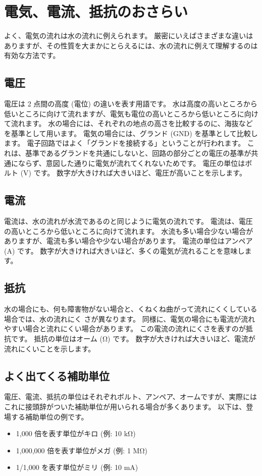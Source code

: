 \documentclass[11pt,a4paper]{jarticle}
\begin{document}
\section{電気、電流、抵抗のおさらい}
よく、電気の流れは水の流れに例えられます。
厳密にいえばさまざまな違いはありますが、その性質を大まかにとらえるには、水の流れに例えて理解するのは有効な方法です。

\subsection*{電圧}
電圧は 2 点間の高度 (電位) の違いを表す用語です。
水は高度の高いところから低いところに向けて流れますが、電気も電位の高いところから低いところに向けて流れます。
水の場合には、それぞれの地点の高さを比較するのに、海抜などを基準として用います。
電気の場合には、グランド (GND) を基準として比較します。
電子回路ではよく「グランドを接続する」ということが行われます。
これは、基準であるグランドを共通にしないと、回路の部分ごとの電圧の基準が共通にならず、意図した通りに電気が流れてくれないためです。
電圧の単位はボルト (V) です。
数字が大きければ大きいほど、電圧が高いことを示します。

\subsection*{電流}
電流は、水の流れが水流であるのと同じように電気の流れです。
電流は、電圧の高いところから低いところに向けて流れます。
水流も多い場合少ない場合がありますが、電流も多い場合や少ない場合があります。
電流の単位はアンペア (A) です。
数字が大きければ大きいほど、多くの電気が流れることを意味します。

\subsection*{抵抗}
水の場合にも、何も障害物がない場合と、くねくね曲がって流れにくくしている場合では、水の流れにく
さが異なります。
同様に、電気の場合にも電流が流れやすい場合と流れにくい場合があります。
この電流の流れにくさを表すのが抵抗です。
抵抗の単位はオーム (Ω) です。
数字が大きければ大きいほど、電流が流れにくいことを示します。

\subsection*{よく出てくる補助単位}
電圧、電流、抵抗の単位はそれぞれボルト、アンペア、オームですが、実際にはこれに接頭辞がついた補助単位が用いられる場合が多くあります。
以下は、登場する補助単位の例です。
\begin{itemize}
 \item 1,000 倍を表す単位がキロ (例: 10 kΩ)
 \item 1,000,000 倍を表す単位がメガ (例: 1 MΩ)
 \item 1/1,000 を表す単位がミリ (例: 10 mA)
\end{itemize}
\end{document}

